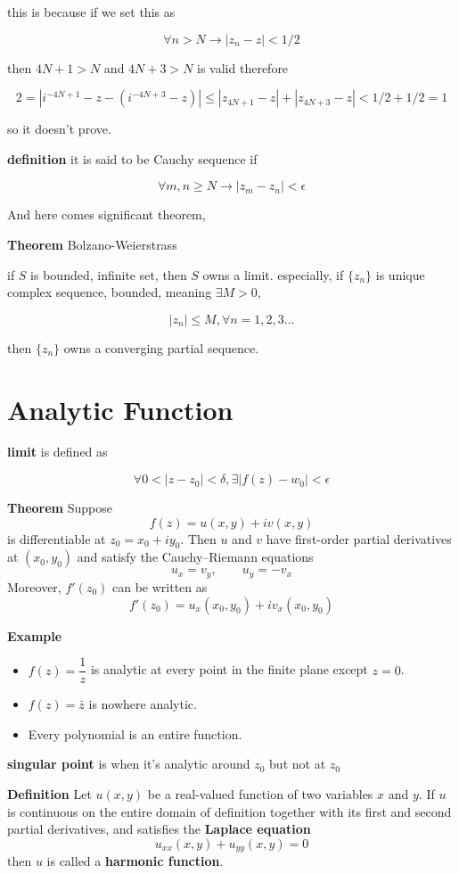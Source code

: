\documentclass{article}
\begin{document}
this is because if we set this as

\[
\forall n>N \rightarrow |z_n-z|<1/2
\]

then $4N+1>N$ and $4N+3>N$ is valid therefore

\[
2=|i^{-4N+1}-z-(i^{-4N+3}-z)|\leq|z_{4N+1}-z|+|z_{4N+3}-z|<1/2+1/2=1
\]

so it doesn't prove.

\textbf{definition} it is said to be Cauchy sequence if 

\[
\forall m,n \geq N \rightarrow |z_m-z_n|<\epsilon
\]

And here comes significant theorem,

\textbf{Theorem} Bolzano-Weierstrass

if $S$ is bounded, infinite set, then $S$ owns a limit. especially, if $\{z_n\}$ is unique complex sequence, bounded, meaning $\exists M>0$,

\[
|z_n|\leq M, \forall n=1,2,3...
\]

then $\{z_n\}$ owns a converging partial sequence.

\section*{Analytic Function}

\textbf{limit} is defined as 

\[
\forall 0<|z-z_0|<\delta, \exists |f(z)-w_0|<\epsilon
\]

\textbf{Theorem} Suppose
\[
f(z) = u(x,y) + iv(x,y)
\]
is differentiable at $z_0 = x_0 + iy_0$. Then $u$ and $v$ have first-order partial derivatives at $(x_0, y_0)$ and satisfy the Cauchy--Riemann equations
\[
u_x = v_y, \qquad u_y = -v_x \tag{2.45}
\]
Moreover, $f'(z_0)$ can be written as
\[
f'(z_0) = u_x(x_0,y_0) + iv_x(x_0,y_0) \tag{2.46}
\]

\textbf{Example}
\begin{itemize}
    \item[(i)] $f(z) = \dfrac{1}{z}$ is analytic at every point in the finite plane except $z = 0$.
    \item[(ii)] $f(z) = \bar{z}$ is nowhere analytic.
    \item[(iii)] Every polynomial is an entire function.
\end{itemize}

\textbf{singular point} is when it's analytic around $z_0$ but not at $z_0$

 \textbf{Definition } Let $u(x,y)$ be a real-valued function of two variables $x$ and $y$. If $u$ is continuous on the entire domain of definition together with its first and second partial derivatives, and satisfies the \textbf{Laplace equation}
\[
u_{xx}(x,y) + u_{yy}(x,y) = 0 \tag{2.60}
\]
then $u$ is called a \textbf{harmonic function}.
\end{document}
